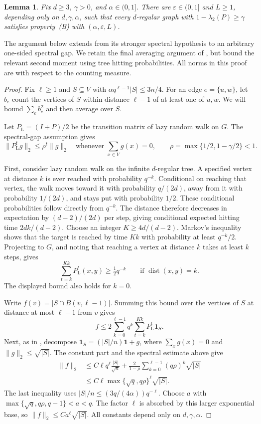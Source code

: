 \documentclass[11pt,reqno]{amsart}
\newtheorem{lemma}[theorem]{Lemma}
\theoremstyle{definition}
\newcommand{\dist}{\operatorname{dist}}
\begin{document}
\begin{lemma}\label{lem:property-B}
Fix $d\ge3$, $\gamma>0$, and $\alpha\in(0,1]$.
There are $\varepsilon\in(0,1]$ and $L\ge1$, depending only
on $d,\gamma,\alpha$, such that every $d$-regular graph with
$1-\lambda_2(P)\ge\gamma$ satisfies property~(B) with $(\alpha,\varepsilon,L)$.
\end{lemma}

The argument below extends \cite[Proposition~1.9(b)]{ADTT} from its
stronger spectral hypothesis to an arbitrary one-sided spectral gap.
We retain the final averaging argument of \cite[Section~5.2]{ADTT},
but bound the relevant second moment using tree hitting probabilities. All norms in this proof are with respect to the counting measure.

\begin{proof}
Fix $\ell\ge1$ and $S\subseteq V$ with
$\alpha q^{\ell-1}|S|\le3n/4$.
For an edge $e=\{u,w\}$, let $b_e$ count the vertices of $S$
within distance $\ell-1$ of at least one of $u,w$.
We will bound $\sum_e b_e^2$ and then average over $S$.

Let $P_{\mathrm L}=(I+P)/2$ be the transition matrix of lazy
random walk on $G$. The spectral-gap assumption gives
\[
 \|P_{\mathrm L}^t g\|_2\le\rho^t\|g\|_2
 \quad\text{whenever }\sum_{x\in V}g(x)=0,
 \qquad \rho=\max\{1/2,1-\gamma/2\}<1.
\]


First, consider lazy random walk on the infinite $d$-regular
tree. A specified vertex at distance $k$ is ever reached with
probability $q^{-k}$. Conditional on reaching that vertex, the
walk moves toward it with probability $q/(2d)$, away from it
with probability $1/(2d)$, and stays put with probability $1/2$.
These conditional probabilities follow directly from $q^{-k}$.
The distance therefore decreases in expectation by $(d-2)/(2d)$
per step, giving conditional expected hitting time $2dk/(d-2)$.
Choose an integer $K\ge4d/(d-2)$.
Markov's inequality shows that the target is reached by time
$Kk$ with probability at least $q^{-k}/2$.
Projecting to $G$, and noting that reaching a vertex at distance
$k$ takes at least $k$ steps, gives
\[
 \sum_{t=k}^{Kk}P_{\mathrm L}^t(x,y)\ge\tfrac12q^{-k}
 \qquad\text{if }\dist(x,y)=k.
\]
The displayed bound also holds for $k=0$.

Write $f(v)=|S\cap B(v,\ell-1)|$. Summing this bound over
the vertices of $S$ at distance at most $\ell-1$ from $v$ gives
\[
 f\le 2\sum_{k=0}^{\ell-1}q^k
             \sum_{t=k}^{Kk}P_{\mathrm L}^t\mathbf1_S.
\]
Next, as in \cite{ADTT}, decompose $\mathbf1_S=(|S|/n)\mathbf1+g$, where
$\sum_xg(x)=0$ and $\|g\|_2\le\sqrt{|S|}$.
The constant part and the spectral estimate above give
\[
 \begin{aligned}
 \|f\|_2
 &\le C\ell q^\ell\frac{|S|}{\sqrt n}
       +\frac2{1-\rho}\sum_{k=0}^{\ell-1}(q\rho)^k\sqrt{|S|}\\
 &\le C\ell\max\{\sqrt q,q\rho\}^\ell\sqrt{|S|}.
 \end{aligned}
\]
The last inequality uses $|S|/n\le(3q/(4\alpha))q^{-\ell}$.
Choose $a$ with $\max\{\sqrt q,q\rho,q-1\}<a<q$.
The factor $\ell$ is absorbed by this larger exponential base,
so $\|f\|_2\le C a^\ell\sqrt{|S|}$.
All constants depend only on $d,\gamma,\alpha$.


\end{proof}
\end{document}
